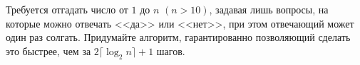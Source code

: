 \documentclass{article}
\begin{document}
Требуется отгадать число от $1$ до $n$ $(n>10)$, задавая лишь вопросы, на которые можно отвечать <<да>> или <<нет>>, при этом отвечающий 
может один раз солгать. Придумайте алгоритм, гарантированно позволяющий сделать это быстрее, чем за $2\lceil \log_2 n \rceil + 1$ шагов.
\end{document}
